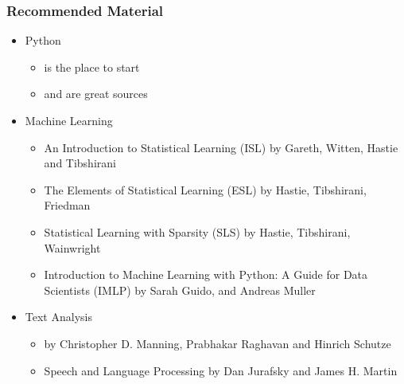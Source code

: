 \documentclass[compress, aspectratio=54]{beamer}
\begin{document}
\begin{frame}
\frametitle{Recommended Material}
\begin{itemize}
\item Python
\begin{itemize}

\item \href{https://www.codecademy.com/catalog/language/python}{\color{ blue}{Codecademy}} is the place to start
\item \href{https://automatetheboringstuff.com/}{\color{ blue}{Automate the Boring Stuff with Python}} and \href{https://realpython.com/}{\color{ blue}{The Real Python}} are great sources
%
\end{itemize}

\item Machine Learning 
\begin{itemize}

\item An Introduction to Statistical Learning (ISL) by Gareth, Witten,  Hastie and Tibshirani
\item  The Elements of Statistical Learning (ESL) by Hastie, Tibshirani, Friedman
\item  Statistical Learning with Sparsity (SLS) by Hastie, Tibshirani, Wainwright
\item  Introduction to Machine Learning with Python: A Guide for Data Scientists (IMLP) by Sarah Guido, and Andreas Muller
\end{itemize}

\item Text Analysis
\begin{itemize}

\item \href{https://nlp.stanford.edu/IR-book/information-retrieval-book.html}{\color{ blue}{Introduction to Information Retrieval}} by Christopher D. Manning, Prabhakar Raghavan and Hinrich Schutze

\item  Speech and Language Processing by Dan Jurafsky and James H. Martin
\end{itemize}
\end{itemize}

\end{frame}
\end{document}
